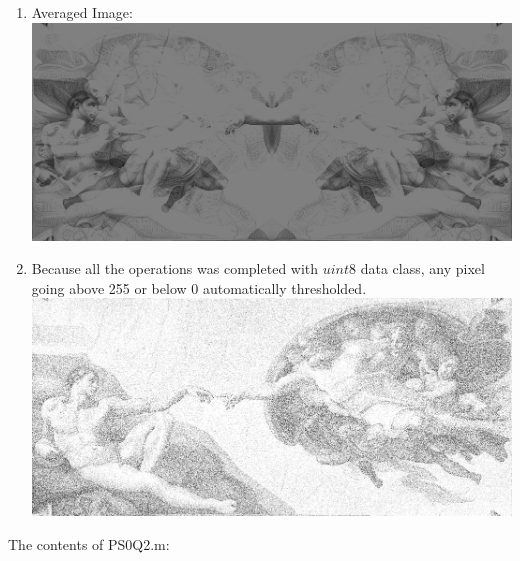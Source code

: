\documentclass{article}
\begin{document}
\begin{enumerate}
\begin{enumerate}
				\item Averaged Image: \\
				\includegraphics[width=\textwidth]{plots/2/avgImgPS0Q2.png}
				\item Because all the operations was completed with $uint8$ data class, any pixel going above 255 or below 0 automatically thresholded. \\
				\includegraphics[width=\textwidth]{plots/2/addNoiseImgPS0Q2.png}
			\end{enumerate}
		The contents of PS0Q2.m: \\
		
	\end{enumerate}
\end{document}
